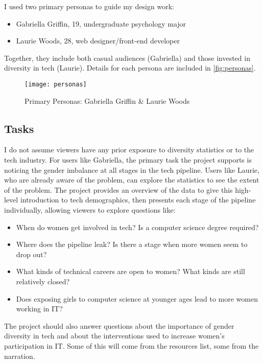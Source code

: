 I used two primary personas to guide my design work:
\begin{itemize}
  \item Gabriella Griffin, 19, undergraduate psychology major
  \item Laurie Woods, 28, web designer/front-end developer
\end{itemize}
Together, they include both casual audiences (Gabriella) and those invested in diversity in tech (Laurie). Details for each persona are included in \autoref{fig:personas}.

\begin{figure}
  \texttt{[image: personas]}
  \caption{Primary Personas: Gabriella Griffin \& Laurie Woods}\label{fig:personas}
\end{figure}

\subsection{Tasks}\label{sec:design-tasks}
I do not assume viewers have any prior exposure to diversity statistics or to the tech industry. For users like Gabriella, the primary task the project supports is noticing the gender imbalance at all stages in the tech pipeline. Users like Laurie, who are already aware of the problem, can explore the statistics to see the extent of the problem. The project provides an overview of the data to give this high-level introduction to tech demographics, then presents each stage of the pipeline individually, allowing viewers to explore questions like:

\begin{itemize}
  \item When do women get involved in tech? Is a computer science degree required?
  \item Where does the pipeline leak? Is there a stage when more women seem to drop out?
  \item What kinds of technical careers are open to women? What kinds are still relatively closed?
  \item Does exposing girls to computer science at younger ages lead to more women working in IT\@?
\end{itemize}

The project should also answer questions about the importance of gender diversity in tech and about the interventions used to increase women's participation in IT\@. Some of this will come from the resources list, some from the narration.


